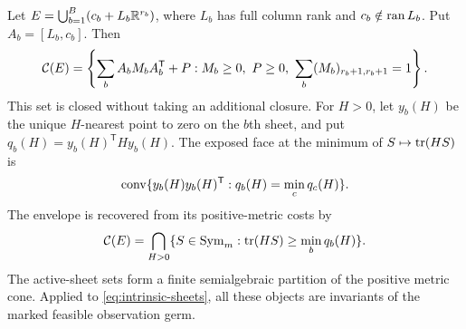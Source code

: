 \begin{theorem}\label{thm:lift}
Let $E=\bigcup_{b=1}^B(c_b+L_b\mathbb R^{r_b})$, where $L_b$ has full column rank and $c_b\notin\operatorname{ran} L_b$. Put $A_b=[L_b,c_b]$. Then
\begin{equation}\label{eq:lift}
 \mathcal C(E)=\left\{\sum_b A_bM_bA_b^{\mathsf T}+P:
 M_b\ge0,\ P\ge0,\ \sum_b(M_b)_{r_b+1,r_b+1}=1\right\}.
\end{equation}
This set is closed without taking an additional closure. For $H>0$, let $y_b(H)$ be the unique $H$-nearest point to zero on the $b$th sheet, and put $q_b(H)=y_b(H)^{\mathsf T}Hy_b(H)$. The exposed face at the minimum of $S\mapsto\operatorname{tr}(HS)$ is
\begin{equation}\label{eq:faces}
 \operatorname{conv}\{y_b(H)y_b(H)^{\mathsf T}:q_b(H)=\min_cq_c(H)\}.
\end{equation}
The envelope is recovered from its positive-metric costs by
\[
 \mathcal C(E)=\bigcap_{H>0}\{S\in\operatorname{Sym}_m:\operatorname{tr}(HS)\ge\min_bq_b(H)\}.
\]
The active-sheet sets form a finite semialgebraic partition of the positive metric cone. Applied to \eqref{eq:intrinsic-sheets}, all these objects are invariants of the marked feasible observation germ.
\end{theorem}
